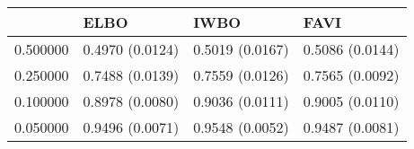 \begin{tabular}{llll}
\toprule
 & ELBO & IWBO & FAVI \\
\midrule
0.500000 & 0.4970 (0.0124) & 0.5019 (0.0167) & 0.5086 (0.0144) \\
0.250000 & 0.7488 (0.0139) & 0.7559 (0.0126) & 0.7565 (0.0092) \\
0.100000 & 0.8978 (0.0080) & 0.9036 (0.0111) & 0.9005 (0.0110) \\
0.050000 & 0.9496 (0.0071) & 0.9548 (0.0052) & 0.9487 (0.0081) \\
\bottomrule
\end{tabular}
